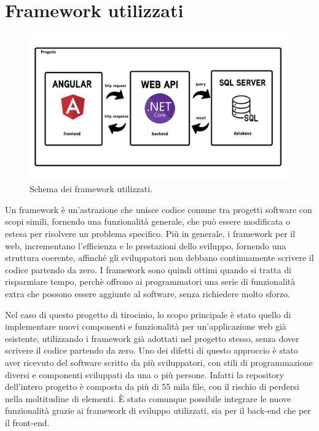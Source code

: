  
\section{Framework utilizzati}\label{sec:Framework}
\begin{figure}[H]
\centering
\includegraphics[width=1\textwidth]{Images/architettura.png}
\caption{\label{fig:arch}Schema dei \gls{framework} utilizzati.}
\end{figure}

Un \gls{framework} è un'astrazione che unisce codice comune tra progetti software con scopi simili, fornendo una funzionalità generale, che può essere modificata o estesa per risolvere un problema specifico.
Più in generale, i \gls{framework} per il web, incrementano l'efficienza e le prestazioni dello sviluppo, fornendo una struttura coerente, affinché gli sviluppatori non debbano continuamente scrivere il codice partendo da zero. I \gls{framework} sono quindi ottimi quando si tratta di risparmiare tempo, perchè offrono ai programmatori una serie di funzionalità extra che possono essere aggiunte al software, senza richiedere molto sforzo.

Nel caso di questo progetto di tirocinio, lo scopo principale è stato quello di implementare nuovi componenti e funzionalità per un'applicazione web già esistente, utilizzando i \gls{framework} già adottati nel progetto stesso, senza dover scrivere il codice partendo da zero. Uno dei difetti di questo approccio è stato aver ricevuto del software scritto da più sviluppatori, con stili di programmazione diversi e componenti sviluppati da una o più persone. Infatti la repository dell'intero progetto è composta da più di 55 mila file, con il rischio di perdersi nella moltitudine di elementi.
È stato comunque possibile integrare le nuove funzionalità grazie ai \gls{framework} di sviluppo utilizzati, sia per il back-end che per il front-end.

